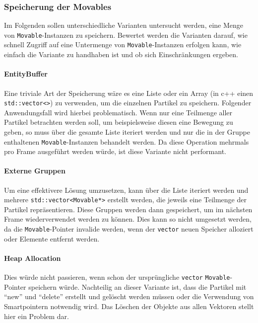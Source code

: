\documentclass[11pt,a4paper]{article}
\begin{document}
\subsubsection{Speicherung der Movables}
Im Folgenden sollen unterschiedliche Varianten untersucht werden, eine Menge von \lstinline!Movable!-Instanzen zu speichern. Bewertet werden die Varianten darauf, wie schnell Zugriff auf eine Untermenge von \lstinline!Movable!-Instanzen erfolgen kann, wie einfach die Variante zu handhaben ist und ob sich Einschränkungen ergeben.
\paragraph{EntityBuffer}
Eine triviale Art der Speicherung wäre es eine Liste oder ein Array (in c++ einen \lstinline!std::vector<>!) zu verwenden, um die einzelnen Partikel zu speichern. Folgender Anwendungsfall wird hierbei problematisch. Wenn nur eine Teilmenge aller Partikel betrachten werden soll, um beispielsweise diesen eine Bewegung zu geben, so muss über die gesamte Liste iteriert werden und nur die in der Gruppe enthaltenen \lstinline!Movable!-Instanzen behandelt werden. Da diese Operation mehrmals pro Frame ausgeführt werden würde, ist diese Variante nicht performant.
\paragraph{Externe Gruppen}
Um eine effektivere Lösung umzusetzen, kann über die Liste iteriert werden und mehrere \lstinline!std::vector<Movable*>! erstellt werden, die jeweils eine Teilmenge der Partikel repräsentieren. Diese Gruppen werden dann gespeichert, um im nächsten Frame wiederverwendet werden zu können. Dies kann so nicht umgesetzt werden, da die \lstinline!Movable!-Pointer invalide werden, wenn der \lstinline!vector! neuen Speicher alloziert oder Elemente entfernt werden.
\paragraph{Heap Allocation}
Dies würde nicht passieren, wenn schon der ursprüngliche \lstinline!vector! \lstinline!Movable!-Pointer speichern würde. Nachteilig an dieser Variante ist, dass die Partikel mit ``new'' und ``delete'' erstellt und gelöscht werden müssen oder die Verwendung von Smartpointern notwendig wird. Das Löschen der Objekte aus allen Vektoren stellt hier ein Problem dar.
\end{document}
